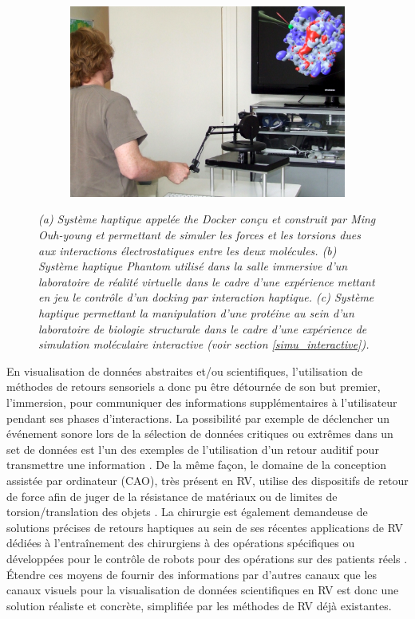 \begin{figure}[h]
\begin{subfigure}{.33\textwidth}
  {\includegraphics[width=0.9\linewidth]{./figures/ch2/ferey_haptic}}
    \caption{}
    \label{Fig:ferey_haptic}
  \end{subfigure}
  \caption{\it (a) Système haptique appelée \textit{the Docker} conçu et construit par Ming Ouh-young et permettant de simuler les forces et les torsions dues aux interactions électrostatiques entre les deux molécules.
  (b) Système haptique Phantom utilisé dans la salle immersive d'un laboratoire de réalité virtuelle dans le cadre d'une expérience mettant en jeu le contrôle d'un docking par interaction haptique. 
  (c) Système haptique permettant la manipulation d'une protéine au sein d'un laboratoire de biologie structurale dans le cadre d'une expérience de simulation moléculaire interactive (voir section \ref{simu_interactive}).
  }
\end{figure}

En visualisation de données abstraites et/ou scientifiques, l'utilisation de méthodes de retours sensoriels a donc pu être détournée de son but premier, l'immersion, pour communiquer des informations supplémentaires à l'utilisateur pendant ses phases d'interactions. La possibilité par exemple de déclencher un événement sonore lors de la sélection de données critiques ou extrêmes dans un set de données est l'un des exemples de l'utilisation d'un retour auditif pour transmettre une information \cite{ferey_multisensory_2009}. De la même façon, le domaine de la conception assistée par ordinateur (CAO), très présent en RV, utilise des dispositifs de retour de force afin de juger de la résistance de matériaux ou de limites de torsion/translation des objets \cite{sun2010haptic}. La chirurgie est également demandeuse de solutions précises de retours haptiques au sein de ses récentes applications de RV dédiées à l’entraînement des chirurgiens à des opérations spécifiques ou développées pour le contrôle de robots pour des opérations sur des patients réels \cite{kusumoto_application_2006}. Étendre ces moyens de fournir des informations par d'autres canaux que les canaux visuels pour la visualisation de données scientifiques en RV est donc une solution réaliste et concrète, simplifiée par les méthodes de RV déjà existantes.

